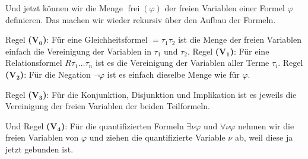 \begin{ai-global-state-checkpoint-invisible-content}
\end{ai-global-state-checkpoint-invisible-content}

\begin{spoken-clean}[01:07:07 - 01:08:52]
Und jetzt können wir die Menge $\operatorname{frei}(\varphi)$ der freien Variablen einer Formel $\varphi$ definieren. Das machen wir wieder rekursiv über den Aufbau der Formeln.

Regel \textbf{(V$_{\mathbf{0}}$)}: Für eine Gleichheitsformel $=\tau_1 \tau_2$ ist die Menge der freien Variablen einfach die Vereinigung der Variablen in $\tau_1$ und $\tau_2$. Regel \textbf{(V$_{\mathbf{1}}$)}: Für eine Relationsformel $R \tau_1 \dots \tau_n$ ist es die Vereinigung der Variablen aller Terme $\tau_i$. Regel \textbf{(V$_{\mathbf{2}}$)}: Für die Negation $\neg\varphi$ ist es einfach dieselbe Menge wie für $\varphi$.
\end{spoken-clean}

\begin{spoken-clean}[01:08:52 - 01:10:37]
Regel \textbf{(V$_{\mathbf{3}}$)}: Für die Konjunktion, Disjunktion und Implikation ist es jeweils die Vereinigung der freien Variablen der beiden Teilformeln.

Und Regel \textbf{(V$_{\mathbf{4}}$)}: Für die quantifizierten Formeln $\exists\nu\varphi$ und $\forall\nu\varphi$ nehmen wir die freien Variablen von $\varphi$ und ziehen die quantifizierte Variable $\nu$ ab, weil diese ja jetzt gebunden ist.
\end{spoken-clean}

